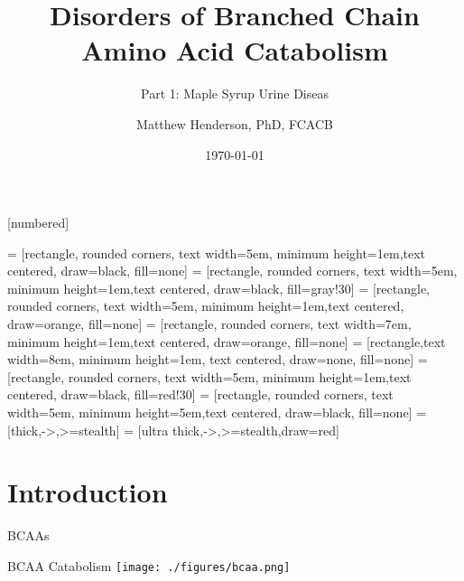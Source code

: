 \documentclass[presentation, smaller]{beamer}
\author{Matthew Henderson, PhD, FCACB}
\date{\today}
\title{Disorders of Branched Chain Amino Acid Catabolism}
\subtitle{Part 1: Maple Syrup Urine Diseas}
\institute[NSO]{Newborn Screening Ontario | The University of Ottawa}
\begin{document}
\maketitle

\vspace{220pt}
\beamertemplatenavigationsymbolsempty
{}[numbered]

 = [rectangle, rounded corners, text width=5em, minimum height=1em,text centered, draw=black, fill=none]
 = [rectangle, rounded corners, text width=5em, minimum height=1em,text centered, draw=black, fill=gray!30]
 = [rectangle, rounded corners, text width=5em, minimum height=1em,text centered, draw=orange, fill=none]
 = [rectangle, rounded corners, text width=7em, minimum height=1em,text centered, draw=orange, fill=none]
 = [rectangle,text width=8em, minimum height=1em, text centered, draw=none, fill=none]
 = [rectangle, rounded corners, text width=5em, minimum height=1em,text centered, draw=black, fill=red!30]
 = [rectangle, rounded corners, text width=5em, minimum height=5em,text centered, draw=black, fill=none]
 = [thick,->,>=stealth]
 = [ultra thick,->,>=stealth,draw=red]

\section{Introduction}
\label{sec:orgheadline3}
\begin{frame}[label={sec:orgheadline1}]{BCAAs}
\centering
{}
\end{frame}

\begin{frame}[label={sec:orgheadline2}]{BCAA Catabolism}
\centering
\texttt{[image: ./figures/bcaa.png]}
\end{frame}
\end{document}
